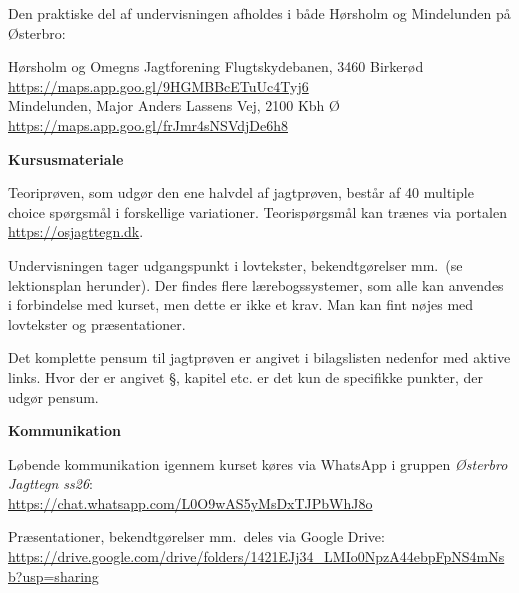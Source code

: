 \documentclass[10pt,a4paper]{article}
\begin{document}
\begin{flushleft}
\vspace{0.2cm}
Den praktiske del af undervisningen afholdes i både Hørsholm og Mindelunden på Østerbro:

\vspace{0.1cm}
\hspace{1em} Hørsholm og Omegns Jagtforening Flugtskydebanen, 3460 Birkerød\\
\hspace{1em} \url{https://maps.app.goo.gl/9HGMBBcETuUc4Tyj6}
\\
\vspace{0.2cm}
\hspace{1em} Mindelunden, Major Anders Lassens Vej, 2100 Kbh Ø\\
\hspace{1em} \url{https://maps.app.goo.gl/frJmr4sNSVdjDe6h8}

\vspace{0.4cm}
\textbf{Kursusmateriale}

\vspace{0.1cm}
Teoriprøven, som udgør den ene halvdel af jagtprøven, består af 40 multiple choice spørgsmål i forskellige variationer. Teorispørgsmål kan trænes via portalen \url{https://osjagttegn.dk}.

\vspace{0.2cm}
Undervisningen tager udgangspunkt i lovtekster, bekendtgørelser mm.\ (se lektionsplan herunder). Der findes flere lærebogssystemer, som alle kan anvendes i forbindelse med kurset, men dette er ikke et krav. Man kan fint nøjes med lovtekster og præsentationer.

\vspace{0.2cm}
Det komplette pensum til jagtprøven er angivet i bilagslisten nedenfor med aktive links. Hvor der er angivet §, kapitel etc. er det kun de specifikke punkter, der udgør pensum. 

\vspace{0.4cm}
\textbf{Kommunikation}

\vspace{0.1cm}
Løbende kommunikation igennem kurset køres via WhatsApp i gruppen \emph{Østerbro Jagttegn ss26}:\\
\url{https://chat.whatsapp.com/L0O9wAS5yMsDxTJPbWhJ8o}

\vspace{0.2cm}
Præsentationer, bekendtgørelser mm.\ deles via Google Drive:\\
\url{https://drive.google.com/drive/folders/1421EJj34_LMIo0NpzA44ebpFpNS4mNsb?usp=sharing}


\end{flushleft}
\end{document}
